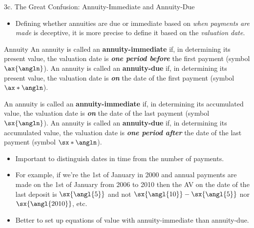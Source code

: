 \begin{CHPT_SUMM_AUTO}[label = {L.-3c}]{3c. The Great Confusion: Annuity-Immediate and Annuity-Due}

\begin{itemize}[leftmargin = *]
		\item	Defining whether annuities are due or immediate based on \textit{when payments are made} is deceptive, it is more precise to define it based on the \textit{valuation date}.
\end{itemize}

\begin{FORMULA_SUMM}{Annuity}
An annuity is called an \textbf{annuity-immediate} if, in determining its present value, the valuation date is \textbf{\textit{one period before}} the first payment (symbol $\ax{\angln}$). An annuity is called an \textbf{annuity-due} if, in determining its present value, the valuation date is \textit{\textbf{on}} the date of the first payment (symbol $\ax*{\angln}$).

\tcbline

An annuity is called an \textbf{annuity-immediate} if, in determining its accumulated value, the valuation date is \textit{\textbf{on}} the date of the last payment (symbol $\sx{\angln}$). An annuity is called an \textbf{annuity-due} if, in determining its accumulated value, the valuation date is \textit{\textbf{one period after}} the date of the last payment (symbol $\sx*{\angln}$).
\end{FORMULA_SUMM}

\begin{itemize}[leftmargin = *]
		\item	Important to distinguish dates in time from the number of payments.
		\item[]	For example, if we're the 1st of January in 2000 and annual payments are made on the 1st of January from 2006 to 2010 then the AV on the date of the last deposit is $\sx{\angl{5}}$ and not $\sx{\angl{10}} - \sx{\angl{5}}$ nor $\sx{\angl{2010}}$, etc.
		\item	Better to set up equations of value with annuity-immediate than annuity-due.
\end{itemize}
\end{CHPT_SUMM_AUTO}

